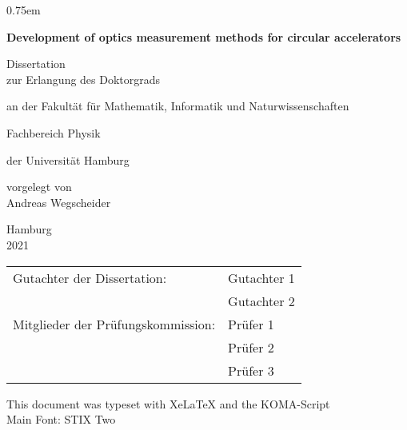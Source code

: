 \thispagestyle{empty}
\vspace{5cm}
\parskip0.75em
\begin{center}
    \Huge\bfseries
    Development of optics measurement methods for circular accelerators

    \vspace{3cm}
    \mdseries\Large
    Dissertation\\
    \vspace{1em}
    zur Erlangung des Doktorgrads

    an der Fakult\"at f\"ur Mathematik, Informatik und Naturwissenschaften
    
    Fachbereich Physik
    
    \vspace{1em}
    der Universit\"at Hamburg

    \vspace{2cm}
    \vfill
    vorgelegt von\\
    Andreas Wegscheider
    \vspace{2em}

    Hamburg\\
    2021
\end{center}
\cleardoublepage
{}

\thispagestyle{empty}
\renewcommand\baselinestretch{1.75}\selectfont
\begin{tabular}{ll}
   Gutachter der Dissertation: & Gutachter 1\\
    & Gutachter 2\\
   Mitglieder der Prüfungskommission: & Prüfer 1\\
   & Prüfer 2\\
   & Prüfer 3
\end{tabular}
\vfill
\renewcommand\baselinestretch{\textlinespread}\selectfont
\noindent This document was typeset with XeLaTeX and the KOMA-Script\\
Main Font: STIX Two

\tableofcontents
\cleardoublepage
